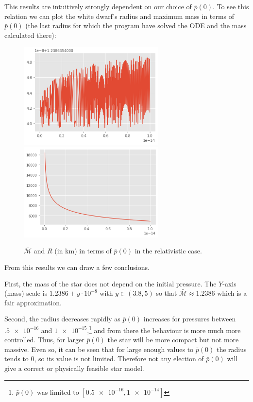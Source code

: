 \documentclass[a4paper]{article}
\newcommand\Mbar{\bar{\mathcal{M}}}
\begin{document}
This results are intuitively strongly dependent on our choice of $\bar{p}(0)$. To see this relation we can plot the white dwarf's radius and maximum mass in terms of $\bar{p}(0)$ (the last radius for which the program have solved the ODE and the mass calculated there):

\begin{figure}[h]
    \includegraphics[width=7.3cm]{images/M-p0.png}
    \includegraphics[width=7.3cm]{images/R-p0.png}
    \centering
    \caption{$\Mbar$ and $R$ (in km) in terms of $\bar{p}(0)$ in the relativistic case.}
\label{fig:Comparison}
\end{figure}

From this results we can draw a few conclusions. 

First, the mass of the star does not depend on the initial pressure. The $Y$-axis (mass) scale is $1.2386 + y\cdot 10^{-8}$ with $y \in (3.8, 5)$ so that $\Mbar \approx 1.2386$ which is a fair approximation.

Second, the radius decreases rapidly as $\bar{p}(0)$ increases for pressures between $\num{.5e-16}$ and $\num{1e-15}$,\footnote{$\bar{p}(0)$ was limited to $[\num{0.5e-16}, \num{1e-14}]$} and from there the behaviour is more much more controlled. Thus, for larger $\bar{p}(0)$ the star will be more compact but not more massive. Even so, it can be seen that for large enough values to $\bar{p}(0)$  the radius tends to 0, so its value is not limited. Therefore not any election of $\bar{p}(0)$ will give a correct or physically feasible star model.
\end{document}
